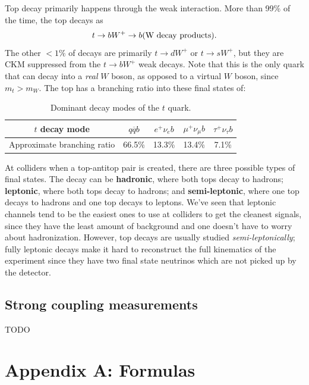\documentclass[11pt, oneside]{article}   	%
\theoremstyle{definition}
\numberwithin{equation}{subsection}		%
\begin{document}
Top decay primarily happens through the weak interaction. More than 99\% of the time, the top decays as
\begin{equation}
	t\rightarrow b W^+\rightarrow b (\textnormal{W decay products}).
\end{equation}
The other $< 1\%$ of decays are primarily $t\rightarrow d W^+$ or $t\rightarrow s W^+$, but they are CKM suppressed from the $t\rightarrow 
b W^+$ weak decays. Note that this is the only quark that can decay into a \textit{real} $W$ boson, as opposed to a virtual $W$ boson, since 
$m_t > m_W$. The top has a branching ratio into these final states of:
\begin{table}[H]
	\centering
	\begin{tabular}{ | c | c | c | c | c | }
		\hline
		$t$ decay mode & $q\overline q b$ & $e^+\nu_e b$ & $\mu^+\nu_\mu b$ & $\tau^+ \nu_\tau b$ \\
		\hline
		Approximate branching ratio & 66.5\% & 13.3\% & 13.4\% & 7.1\% \\
		\hline
	\end{tabular}
	\caption{Dominant decay modes of the $t$ quark.}
	\label{table:t_decay}
\end{table}
At colliders when a top-antitop pair is created, there are three possible types of final states. The decay can be \textbf{hadronic}, where 
both tops decay to hadrons; \textbf{leptonic}, where both tops decay to hadrons; and \textbf{semi-leptonic}, where one top decays to 
hadrons and one top decays to leptons. We've seen that leptonic channels tend to be the easiest ones to use at colliders to get the 
cleanest signals, since they have the least amount of background and one doesn't have to worry about hadronization. However, 
top decays are usually studied \textit{semi-leptonically}; fully leptonic decays make it hard to reconstruct the full kinematics of the experiment 
since they have two final state neutrinos which are not picked up by the detector. 


\subsection{Strong coupling measurements}

TODO

\newpage
\section*{Appendix A: Formulas}
\end{document}
